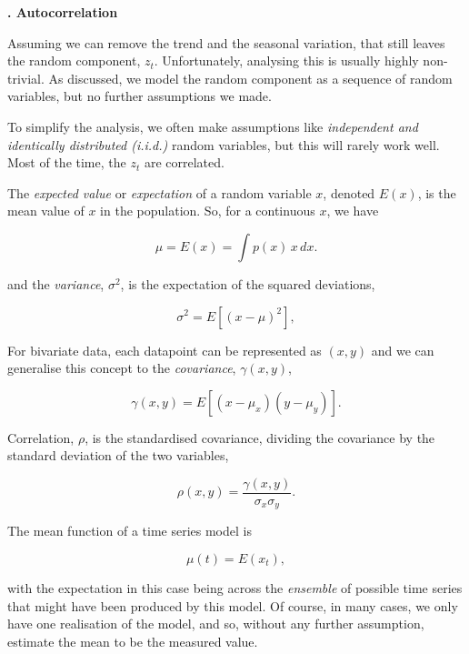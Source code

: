 \documentclass[10pt, a4paper]{article}
\newcounter{wssection}
\newcommand{\worksheetsection}[1]{
\vspace{10mm}
\stepcounter{wssection}
\noindent \Large \textbf{\thewssection. #1} \normalsize
\vspace{3mm}
}
\begin{document}

\worksheetsection{Autocorrelation}

\noindent
Assuming we can remove the trend and the seasonal variation, that
still leaves the random component, $z_t$. Unfortunately, analysing
this is usually highly non-trivial. As discussed, we model the random
component as a sequence of random variables, but no further
assumptions we made.

To simplify the analysis, we often make assumptions like
\emph{independent and identically distributed (i.i.d.)} random
variables, but this will rarely work well. Most of the time, the $z_t$
are correlated.

The \emph{expected value} or \emph{expectation} of a random variable
$x$, denoted $E(x)$, is the mean value of $x$ in the population. So,
for a continuous $x$, we have

\begin{equation}
\mu = E(x) = \int p(x) \, x \, dx.
\end{equation}

\noindent
and the \emph{variance}, $\sigma^2$, is the expectation of the squared
deviations,

\begin{equation}
\sigma^2 = E[(x - \mu)^2],
\end{equation}

For bivariate data, each datapoint can be represented as $(x, y)$ and
we can generalise this concept to the \emph{covariance},
$\gamma(x, y)$,

\begin{equation}
\gamma(x, y) = E[(x - \mu_x)(y - \mu_y)].
\end{equation}

\noindent
Correlation, $\rho$, is the standardised covariance, dividing the
covariance by the standard deviation of the two variables,

\begin{equation}
\rho(x, y) = \frac{\gamma(x, y)}{\sigma_x \sigma_y}.
\end{equation}

\noindent
The mean function of a time series model is

\begin{equation}
\mu(t) = E(x_t),
\end{equation}

\noindent
with the expectation in this case being across the \emph{ensemble} of
possible time series that might have been produced by this model. Of
course, in many cases, we only have one realisation of the model, and
so, without any further assumption, estimate the mean to be the
measured value.
\end{document}
